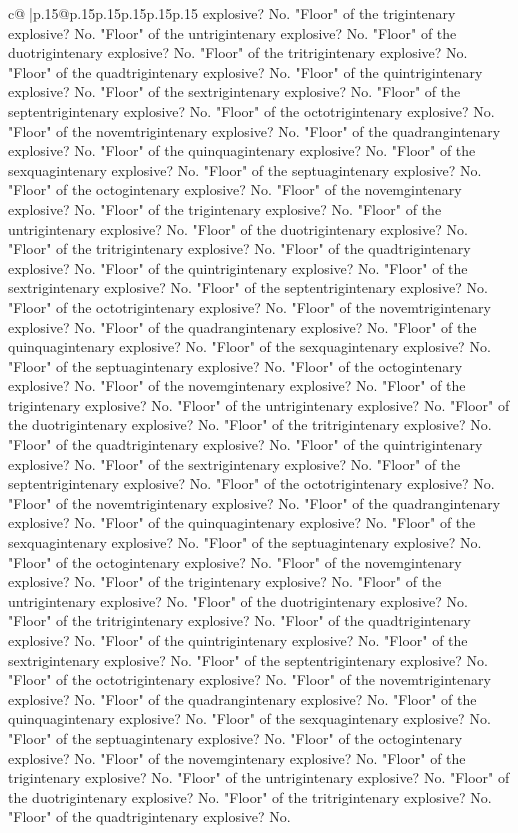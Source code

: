 \documentclass{article}
\begin{document}
{\begin{supertabular}{c@{$\;$}|p{.15\linewidth}@{}p{.15\linewidth}p{.15\linewidth}p{.15\linewidth}p{.15\linewidth}p{.15\linewidth}}
{{{explosive? No. "Floor" of the trigintenary explosive? No. "Floor" of the untrigintenary explosive? No. "Floor" of the duotrigintenary explosive? No. "Floor" of the tritrigintenary explosive? No. "Floor" of the quadtrigintenary explosive? No. "Floor" of the quintrigintenary explosive? No. "Floor" of the sextrigintenary explosive? No. "Floor" of the septentrigintenary explosive? No. "Floor" of the octotrigintenary explosive? No. "Floor" of the novemtrigintenary explosive? No. "Floor" of the quadrangintenary explosive? No. "Floor" of the quinquagintenary explosive? No. "Floor" of the sexquagintenary explosive? No. "Floor" of the septuagintenary explosive? No. "Floor" of the octogintenary explosive? No. "Floor" of the novemgintenary explosive? No. "Floor" of the trigintenary explosive? No. "Floor" of the untrigintenary explosive? No. "Floor" of the duotrigintenary explosive? No. "Floor" of the tritrigintenary explosive? No. "Floor" of the quadtrigintenary explosive? No. "Floor" of the quintrigintenary explosive? No. "Floor" of the sextrigintenary explosive? No. "Floor" of the septentrigintenary explosive? No. "Floor" of the octotrigintenary explosive? No. "Floor" of the novemtrigintenary explosive? No. "Floor" of the quadrangintenary explosive? No. "Floor" of the quinquagintenary explosive? No. "Floor" of the sexquagintenary explosive? No. "Floor" of the septuagintenary explosive? No. "Floor" of the octogintenary explosive? No. "Floor" of the novemgintenary explosive? No. "Floor" of the trigintenary explosive? No. "Floor" of the untrigintenary explosive? No. "Floor" of the duotrigintenary explosive? No. "Floor" of the tritrigintenary explosive? No. "Floor" of the quadtrigintenary explosive? No. "Floor" of the quintrigintenary explosive? No. "Floor" of the sextrigintenary explosive? No. "Floor" of the septentrigintenary explosive? No. "Floor" of the octotrigintenary explosive? No. "Floor" of the novemtrigintenary explosive? No. "Floor" of the quadrangintenary explosive? No. "Floor" of the quinquagintenary explosive? No. "Floor" of the sexquagintenary explosive? No. "Floor" of the septuagintenary explosive? No. "Floor" of the octogintenary explosive? No. "Floor" of the novemgintenary explosive? No. "Floor" of the trigintenary explosive? No. "Floor" of the untrigintenary explosive? No. "Floor" of the duotrigintenary explosive? No. "Floor" of the tritrigintenary explosive? No. "Floor" of the quadtrigintenary explosive? No. "Floor" of the quintrigintenary explosive? No. "Floor" of the sextrigintenary explosive? No. "Floor" of the septentrigintenary explosive? No. "Floor" of the octotrigintenary explosive? No. "Floor" of the novemtrigintenary explosive? No. "Floor" of the quadrangintenary explosive? No. "Floor" of the quinquagintenary explosive? No. "Floor" of the sexquagintenary explosive? No. "Floor" of the septuagintenary explosive? No. "Floor" of the octogintenary explosive? No. "Floor" of the novemgintenary explosive? No. "Floor" of the trigintenary explosive? No. "Floor" of the untrigintenary explosive? No. "Floor" of the duotrigintenary explosive? No. "Floor" of the tritrigintenary explosive? No. "Floor" of the quadtrigintenary explosive? No. }}}
\end{supertabular}}
\end{document}
